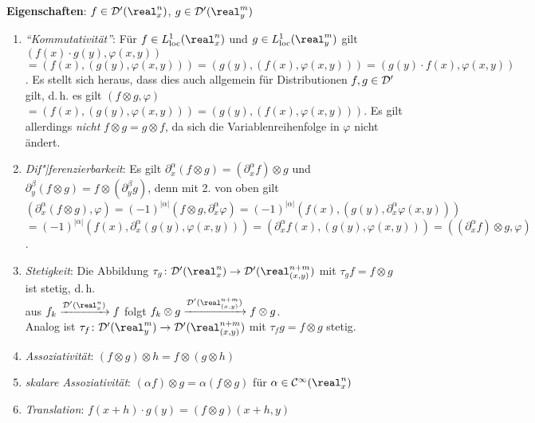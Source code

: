 \textbf{Eigenschaften}: $f \in \D'(\real^n_x)$, $g \in \D'(\real^m_y)$
\begin{enumerate}
    \item
    \emph{"`Kommutativität"'}:
    Für $f \in L^1_\loc(\real^n_x)$ und $g \in L^1_\loc(\real^m_y)$ gilt
    $(f(x) \cdot g(y), \varphi(x, y))$\\
    $= (f(x), (g(y), \varphi(x, y))) =
    (g(y), (f(x), \varphi(x, y))) = (g(y) \cdot f(x), \varphi(x, y))$.
    Es stellt sich heraus, dass dies auch allgemein für Distributionen
    $f, g \in \mathcal{D}'$ gilt, d.\,h. es gilt
    $(f \otimes g, \varphi)$\\
    $= (f(x), (g(y), \varphi(x, y))) = (g(y), (f(x), \varphi(x, y)))$.
    Es gilt allerdings \emph{nicht} $f \otimes g = g \otimes f$, da sich die
    Variablenreihenfolge in $\varphi$ nicht ändert.

    \item
    \emph{Dif"|ferenzierbarkeit}:
    Es gilt $\partial_x^\alpha (f \otimes g) = (\partial_x^\alpha f) \otimes g$
    und $\partial_y^\beta (f \otimes g) = f \otimes (\partial_y^\beta g)$,
    denn mit 2. von oben gilt
    $(\partial_x^\alpha (f \otimes g), \varphi) =
    (-1)^{|\alpha|} (f \otimes g, \partial_x^\alpha \varphi) =
    (-1)^{|\alpha|} (f(x), (g(y), \partial_x^\alpha \varphi(x, y)))$\\
    $= (-1)^{|\alpha|} (f(x), \partial_x^\alpha (g(y), \varphi(x, y))) =
    (\partial_x^\alpha f(x), (g(y), \varphi(x, y))) =
    ((\partial_x^\alpha f) \otimes g, \varphi)$.

    \item
    \emph{Stetigkeit}:
    Die Abbildung $\tau_g\colon \D'(\real^n_x) \rightarrow
    \D'(\real^{n+m}_{(x,y)})$ mit $\tau_g f = f \otimes g$ ist stetig, d.\,h.\\
    aus $f_k \xrightarrow{\D'(\real^n_x)} f$ folgt
    $f_k \otimes g \xrightarrow{\D'(\real^{n+m}_{(x,y)})} f \otimes g$.\\
    Analog ist $\tau_f\colon \D'(\real^m_y) \rightarrow
    \D'(\real^{n+m}_{(x,y)})$ mit $\tau_f g = f \otimes g$ stetig.

    \item
    \emph{Assoziativität}:
    $(f \otimes g) \otimes h = f \otimes (g \otimes h)$

    \item
    \emph{skalare Assoziativität}:
    $(\alpha f) \otimes g = \alpha (f \otimes g)$ für
    $\alpha \in \C^\infty(\real^n_x)$

    \item
    \emph{Translation}:
    $f(x + h) \cdot g(y) = (f \otimes g)(x + h, y)$
\end{enumerate}

